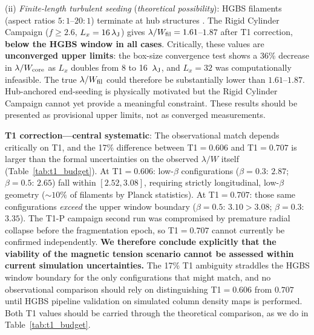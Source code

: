 \documentclass[twoside,twocolumn]{mnras}
\begin{document}
(ii) \textit{Finite-length turbulent seeding} (\textit{theoretical possibility}):
HGBS filaments (aspect ratios $5:1$--$20:1$) terminate at hub structures \citep{Andre2010}.
The Rigid Cylinder Campaign ($f \geq 2.6$, $L_x=16\,\lambda_{\rm J}$) gives
$\lambda/W_{\rm fil} = 1.61$--$1.87$ after T1 correction, \textbf{below the HGBS
window in all cases}. Critically, these values are \textbf{unconverged upper limits}:
the box-size convergence test shows a 36\% decrease in $\lambda/W_{\rm core}$ as
$L_x$ doubles from 8 to 16~$\lambda_{\rm J}$, and $L_x=32$ was computationally
infeasible. The true $\lambda/W_{\rm fil}$ could therefore be substantially lower than
$1.61$--$1.87$. Hub-anchored end-seeding is physically motivated but the Rigid
Cylinder Campaign cannot yet provide a meaningful constraint. These results should
be presented as provisional upper limits, not as converged measurements.

\textbf{T1 correction---central systematic}: The observational match depends critically
on T1, and the 17\% difference between T1$=0.606$ and T1$=0.707$ is larger than the
formal uncertainties on the observed $\lambda/W$ itself (Table~\ref{tab:t1_budget}).
At T1$=0.606$: low-$\beta$ configurations ($\beta=0.3$: $2.87$; $\beta=0.5$: $2.65$)
fall within $[2.52, 3.08]$, requiring strictly longitudinal, low-$\beta$ geometry
(${\sim}10\%$ of filaments by Planck statistics). At T1$=0.707$: those same
configurations \textit{exceed} the upper window boundary ($\beta=0.5$: $3.10 > 3.08$;
$\beta=0.3$: $3.35$). The T1-P campaign second run was compromised by premature radial
collapse before the fragmentation epoch, so T1$=0.707$ cannot currently be confirmed
independently. \textbf{We therefore conclude explicitly that the viability of the
magnetic tension scenario cannot be assessed within current simulation uncertainties.}
The 17\% T1 ambiguity straddles the HGBS window boundary for the only configurations
that might match, and no observational comparison should rely on distinguishing
T1$=0.606$ from $0.707$ until HGBS pipeline validation on simulated column density
maps is performed. Both T1 values should be carried through the theoretical comparison,
as we do in Table~\ref{tab:t1_budget}.
\end{document}
